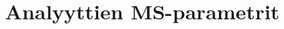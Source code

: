 \chapter{Analyyttien MS-parametrit}\label{appx:parametrit} %
\def\taulukkohead{\centering\begin{tabular}{lrrrrlr}
    \toprule
    \multicolumn{1}{l}{\multirow{2}[0]{*}{Nimi}} & \multicolumn{1}{c}{Molekyyli-} & \multicolumn{1}{c}{Tuote-} & \multicolumn{1}{c}{Cone} & \multicolumn{1}{c}{Törmäytys-} & \multicolumn{1}{c}{Ioni-} & \multicolumn{1}{c}{$t_R$}\\
    
    \multicolumn{1}{l}{} & \multicolumn{1}{c}{ioni (m/z)} & \multicolumn{1}{c}{ioni (m/z)} & \multicolumn{1}{c}{(V)} & \multicolumn{1}{c}{energia (eV)} & \multicolumn{1}{c}{saatio} &  (min) \\
\midrule}


